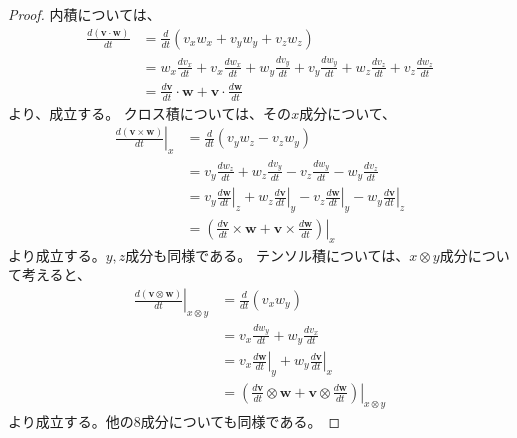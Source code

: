 \begin{proof}
	内積については、
	\begin{equation}
		\begin{split}
			\frac{d(\boldsymbol{v}\cdot\boldsymbol{w})}{dt}
			& =\frac{d}{dt}(v_x w_x+v_y w_y+v_z w_z) \\
			& = w_x\frac{d v_x }{dt}+v_x\frac{d w_x }{dt}
			+w_y\frac{d v_y }{dt}+v_y\frac{d w_y }{dt}
			+w_z\frac{d v_z }{dt}+v_z\frac{d w_z }{dt} \\
			& =\frac{d\boldsymbol{v}}{dt}\cdot\boldsymbol{w}+\boldsymbol{v}\cdot\frac{d\boldsymbol{w}}{dt}
		\end{split}
	\end{equation}
	より、成立する。
	クロス積については、その\(x\)成分について、
	\begin{equation}
		\begin{split}
			\left. \frac{d(\boldsymbol{v}\times\boldsymbol{w})}{dt} \right|_x
			& =\frac{d}{dt}(v_y w_z - v_z w_y) \\
			&
			=v_y\frac{d w_z }{dt}+w_z\frac{d v_y }{dt}
			-v_z\frac{d w_y }{dt}-w_y\frac{d v_z }{dt} \\
			&
			=v_y\left.\frac{d \boldsymbol{w} }{dt}\right|_z+w_z\left.\frac{d \boldsymbol{v}}{dt}\right|_y
			-v_z\left.\frac{d \boldsymbol{w} }{dt}\right|_y-w_y\left.\frac{d \boldsymbol{v} }{dt}\right|_z \\
			& =\left.\left(\frac{d\boldsymbol{v}}{dt}\times\boldsymbol{w}+\boldsymbol{v}\times\frac{d\boldsymbol{w}}{dt}\right)\right|_x
		\end{split}
	\end{equation}
	より成立する。\(y,z\)成分も同様である。
	テンソル積については、\(x\otimes y\)成分について考えると、
	\begin{equation}
		\begin{split}
			\left. \frac{d(\boldsymbol{v}\otimes\boldsymbol{w})}{dt} \right|_{x\otimes y}
			& =\frac{d}{dt}(v_x w_y) \\
			& = v_x\frac{d w_y }{dt}+w_y\frac{d v_x }{dt}
			\\
			&
			=v_x\left.\frac{d \boldsymbol{w} }{dt}\right|_y+w_y\left.\frac{d \boldsymbol{v}}{dt}\right|_x
			\\
			& =\left.\left(\frac{d\boldsymbol{v}}{dt}\otimes\boldsymbol{w}+\boldsymbol{v}\otimes\frac{d\boldsymbol{w}}{dt}\right)\right|_{x\otimes y}
		\end{split}
	\end{equation}
	より成立する。他の8成分についても同様である。
\end{proof}

